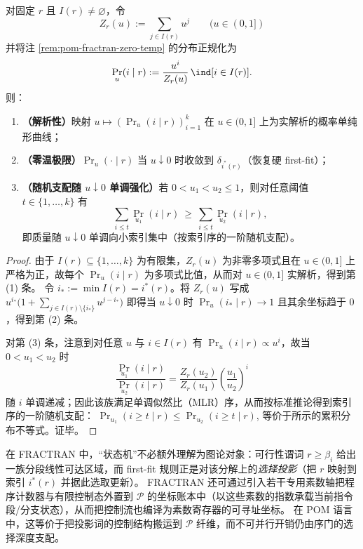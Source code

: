 \begin{proposition}\label{prop:pom-fractran-soft-firstfit-analytic-dominance}
对固定 \(r\) 且 \(I(r)\neq\varnothing\)，令
\[
Z_r(u):=\sum_{j\in I(r)}u^{j}\qquad(u\in(0,1])
\]
并将注 \ref{rem:pom-fractran-zero-temp} 的分布正规化为
\[
\Pr_u(i\mid r):=\frac{u^{i}}{Z_r(u)}\,\ind[i\in I(r)].
\]
则：
\begin{enumerate}
  \item \textbf{（解析性）}映射 \(u\mapsto (\Pr_u(i\mid r))_{i=1}^{k}\) 在 \(u\in(0,1]\) 上为实解析的概率单纯形曲线；
  \item \textbf{（零温极限）}\(\Pr_u(\cdot\mid r)\) 当 \(u\downarrow 0\) 时收敛到 \(\delta_{i^\ast(r)}\)（恢复硬 first-fit）；
  \item \textbf{（随机支配随 \(u\downarrow 0\) 单调强化）}若 \(0<u_1<u_2\le 1\)，则对任意阈值 \(t\in\{1,\dots,k\}\) 有
  \[
  \sum_{i\le t}\Pr_{u_1}(i\mid r)\ \ge\ \sum_{i\le t}\Pr_{u_2}(i\mid r),
  \]
  即质量随 \(u\downarrow 0\) 单调向小索引集中（按索引序的一阶随机支配）。
\end{enumerate}
\end{proposition}
\begin{proof}
由于 \(I(r)\subseteq\{1,\dots,k\}\) 为有限集，\(Z_r(u)\) 为非零多项式且在 \(u\in(0,1]\) 上严格为正，故每个 \(\Pr_u(i\mid r)\) 为多项式比值，从而对 \(u\in(0,1]\) 实解析，得到第 (1) 条。
令 \(i_\ast:=\min I(r)=i^\ast(r)\)。将 \(Z_r(u)\) 写成 \(u^{i_\ast}\bigl(1+\sum_{j\in I(r)\setminus\{i_\ast\}}u^{j-i_\ast}\bigr)\) 即得当 \(u\downarrow 0\) 时 \(\Pr_u(i_\ast\mid r)\to 1\) 且其余坐标趋于 \(0\)，得到第 (2) 条。
\par
对第 (3) 条，注意到对任意 \(u\) 与 \(i\in I(r)\) 有 \(\Pr_u(i\mid r)\propto u^{i}\)，故当 \(0<u_1<u_2\) 时
\[
\frac{\Pr_{u_1}(i\mid r)}{\Pr_{u_2}(i\mid r)}
=
\frac{Z_r(u_2)}{Z_r(u_1)}\left(\frac{u_1}{u_2}\right)^{i}
\]
随 \(i\) 单调递减；因此该族满足单调似然比（MLR）序，从而按标准推论得到索引序的一阶随机支配：
\(
\Pr_{u_1}(i\ge t\mid r)\le \Pr_{u_2}(i\ge t\mid r)
\),
等价于所示的累积分布不等式。证毕。
\end{proof}



\begin{remark}\label{rem:pom-fractran-controlflow}
在 FRACTRAN 中，“状态机”不必额外理解为图论对象：可行性谓词 \(r\ge \beta_i\) 给出一族分段线性可达区域，而 first-fit 规则正是对该分解上的\emph{选择投影}（把 \(r\) 映射到索引 \(i^\ast(r)\) 并据此选取更新）。
FRACTRAN 还可通过引入若干专用素数轴把程序计数器与有限控制态外置到 \(\mathcal{P}\) 的坐标账本中（以这些素数的指数承载当前指令段/分支状态），从而把控制流也编译为素数寄存器的可寻址坐标。
在 POM 语言中，这等价于把投影词的控制结构搬运到 \(\mathcal{P}\) 纤维，而不可并行开销仍由序门的选择深度支配。
\end{remark}

